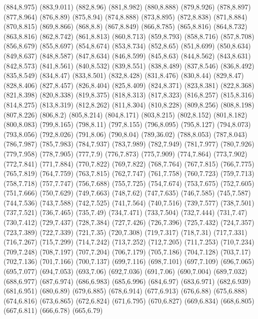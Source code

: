 (884,8.975)
(883,9.011)
(882,8.96)
(881,8.982)
(880,8.888)
(879,8.926)
(878,8.897)
(877,8.964)
(876,8.89)
(875,8.94)
(874,8.888)
(873,8.895)
(872,8.838)
(871,8.884)
(870,8.815)
(869,8.866)
(868,8.8)
(867,8.849)
(866,8.785)
(865,8.816)
(864,8.732)
(863,8.816)
(862,8.742)
(861,8.813)
(860,8.713)
(859,8.793)
(858,8.716)
(857,8.708)
(856,8.679)
(855,8.697)
(854,8.674)
(853,8.734)
(852,8.65)
(851,8.699)
(850,8.634)
(849,8.637)
(848,8.587)
(847,8.634)
(846,8.599)
(845,8.63)
(844,8.562)
(843,8.631)
(842,8.573)
(841,8.561)
(840,8.532)
(839,8.551)
(838,8.489)
(837,8.546)
(836,8.492)
(835,8.549)
(834,8.47)
(833,8.501)
(832,8.428)
(831,8.476)
(830,8.44)
(829,8.47)
(828,8.406)
(827,8.457)
(826,8.404)
(825,8.409)
(824,8.371)
(823,8.381)
(822,8.368)
(821,8.398)
(820,8.338)
(819,8.375)
(818,8.313)
(817,8.323)
(816,8.257)
(815,8.316)
(814,8.275)
(813,8.319)
(812,8.262)
(811,8.304)
(810,8.228)
(809,8.256)
(808,8.198)
(807,8.226)
(806,8.2)
(805,8.214)
(804,8.171)
(803,8.215)
(802,8.152)
(801,8.182)
(800,8.083)
(799,8.165)
(798,8.11)
(797,8.155)
(796,8.095)
(795,8.127)
(794,8.073)
(793,8.056)
(792,8.026)
(791,8.06)
(790,8.04)
(789,36.02)
(788,8.053)
(787,8.043)
(786,7.987)
(785,7.983)
(784,7.937)
(783,7.989)
(782,7.949)
(781,7.977)
(780,7.926)
(779,7.958)
(778,7.905)
(777,7.9)
(776,7.873)
(775,7.909)
(774,7.864)
(773,7.902)
(772,7.841)
(771,7.884)
(770,7.822)
(769,7.822)
(768,7.764)
(767,7.815)
(766,7.775)
(765,7.819)
(764,7.759)
(763,7.815)
(762,7.747)
(761,7.758)
(760,7.723)
(759,7.713)
(758,7.718)
(757,7.747)
(756,7.688)
(755,7.725)
(754,7.674)
(753,7.675)
(752,7.605)
(751,7.666)
(750,7.629)
(749,7.663)
(748,7.62)
(747,7.635)
(746,7.585)
(745,7.587)
(744,7.536)
(743,7.588)
(742,7.525)
(741,7.564)
(740,7.516)
(739,7.577)
(738,7.501)
(737,7.521)
(736,7.465)
(735,7.49)
(734,7.471)
(733,7.504)
(732,7.444)
(731,7.47)
(730,7.412)
(729,7.437)
(728,7.384)
(727,7.426)
(726,7.396)
(725,7.432)
(724,7.357)
(723,7.389)
(722,7.339)
(721,7.35)
(720,7.308)
(719,7.317)
(718,7.31)
(717,7.331)
(716,7.267)
(715,7.299)
(714,7.242)
(713,7.252)
(712,7.205)
(711,7.253)
(710,7.234)
(709,7.248)
(708,7.197)
(707,7.204)
(706,7.179)
(705,7.186)
(704,7.128)
(703,7.17)
(702,7.136)
(701,7.166)
(700,7.137)
(699,7.116)
(698,7.101)
(697,7.109)
(696,7.065)
(695,7.077)
(694,7.053)
(693,7.06)
(692,7.036)
(691,7.06)
(690,7.004)
(689,7.032)
(688,6.977)
(687,6.974)
(686,6.983)
(685,6.996)
(684,6.97)
(683,6.971)
(682,6.939)
(681,6.951)
(680,6.89)
(679,6.885)
(678,6.914)
(677,6.913)
(676,6.88)
(675,6.888)
(674,6.816)
(673,6.865)
(672,6.824)
(671,6.795)
(670,6.827)
(669,6.834)
(668,6.805)
(667,6.811)
(666,6.78)
(665,6.79)
